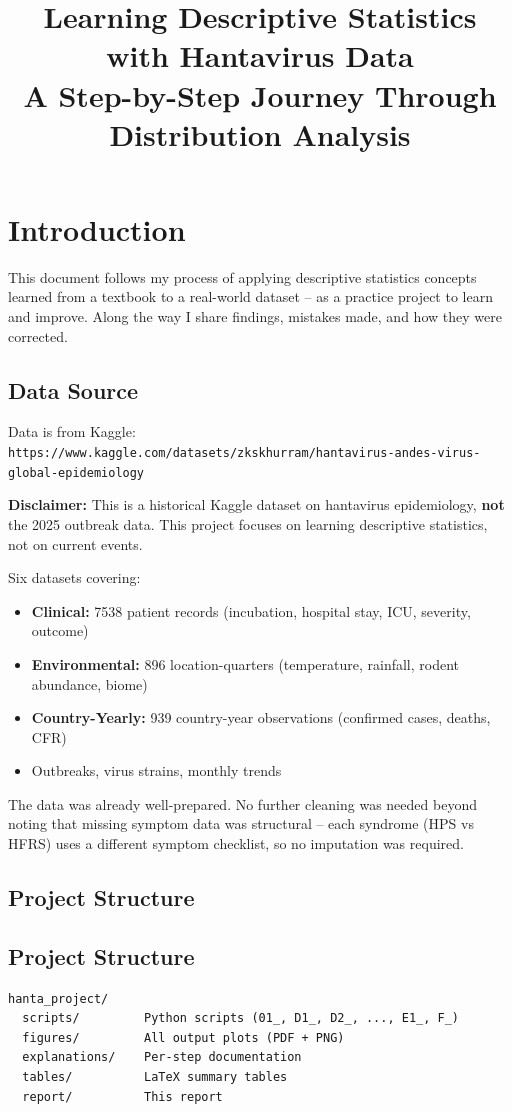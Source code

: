 \documentclass[11pt,a4paper]{article}
\title{Learning Descriptive Statistics with Hantavirus Data \\
\large A Step-by-Step Journey Through Distribution Analysis}
\author{}
\date{}
\begin{document}
\maketitle
\thispagestyle{empty}

\section{Introduction}

This document follows my process of applying descriptive statistics concepts learned from a
textbook to a real-world dataset -- as a practice project to learn and improve.
Along the way I share findings, mistakes made, and how they were corrected.

\subsection{Data Source}
Data is from Kaggle: \texttt{https://www.kaggle.com/datasets/zkskhurram/hantavirus-andes-virus-global-epidemiology}

\textbf{Disclaimer:} This is a historical Kaggle dataset on hantavirus epidemiology, \textbf{not} the 2025 outbreak data. This project focuses on learning descriptive statistics, not on current events.

Six datasets covering:
\begin{itemize}
\item \textbf{Clinical:} 7538 patient records (incubation, hospital stay, ICU, severity, outcome)
\item \textbf{Environmental:} 896 location-quarters (temperature, rainfall, rodent abundance, biome)
\item \textbf{Country-Yearly:} 939 country-year observations (confirmed cases, deaths, CFR)
\item Outbreaks, virus strains, monthly trends
\end{itemize}

The data was already well-prepared. No further cleaning was needed beyond noting that
missing symptom data was structural -- each syndrome (HPS vs HFRS) uses a different
symptom checklist, so no imputation was required.

\subsection{Project Structure}

\subsection{Project Structure}
\begin{verbatim}
hanta_project/
  scripts/         Python scripts (01_, D1_, D2_, ..., E1_, F_)
  figures/         All output plots (PDF + PNG)
  explanations/    Per-step documentation
  tables/          LaTeX summary tables
  report/          This report
\end{verbatim}
\end{document}
